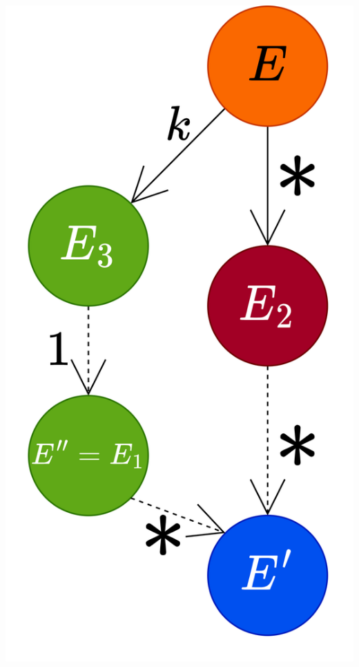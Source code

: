 \begin{center}
	\includegraphics[scale=0.1]{structural_induction/images/confluence_inductive_case_B.drawio.png}
\end{center}


